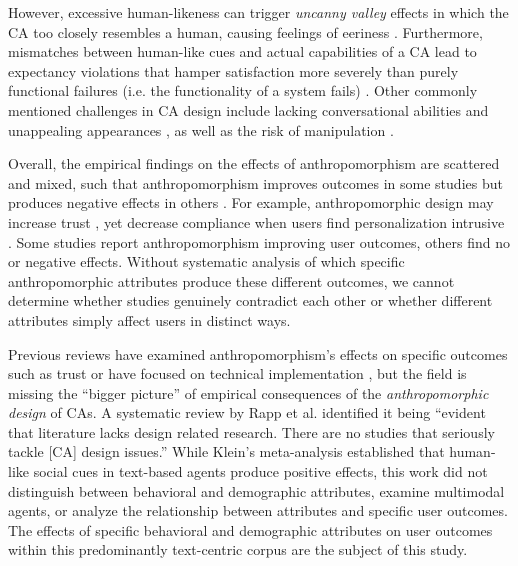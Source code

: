 \documentclass[lettersize,journal]{IEEEtran}
\begin{document}
However, excessive human-likeness can trigger \textit{uncanny valley} effects in which the CA too closely resembles a human, causing feelings of eeriness \cite{mori_bukimi_1970,soni2024chatbot}. Furthermore, mismatches between human-like cues and actual capabilities of a CA lead to expectancy violations that hamper satisfaction more severely than purely functional failures (i.e. the functionality of a system fails) \cite{ischen2024communication,qu2024chatbot}. Other commonly mentioned challenges in CA design include lacking conversational abilities and unappealing appearances \cite{diederich_design_2022}, as well as the risk of manipulation \cite{chaves2021should}.

Overall, the empirical findings on the effects of anthropomorphism are scattered and mixed, such that anthropomorphism improves outcomes in some studies \cite{go2019humanizing} but produces negative effects in others \cite{crolic2022blame}. For example, anthropomorphic design may increase trust \cite{go2019humanizing,konya2023anthropomorphism}, yet decrease compliance when users find personalization intrusive \cite{chen_you_2021}. Some studies report anthropomorphism improving user outcomes, others find no or negative effects. Without systematic analysis of which specific anthropomorphic attributes produce these different outcomes, we cannot determine whether studies genuinely contradict each other or whether different attributes simply affect users in distinct ways.

Previous reviews have examined anthropomorphism's effects on specific outcomes such as trust \cite{bach2024systematic} or have focused on technical implementation \cite{chen2024trends}, but the field is missing the ``bigger picture'' of empirical consequences of the \textit{anthropomorphic design} of CAs. A systematic review by Rapp et al. \cite{rapp_human_2021} identified it being ``evident that literature lacks design related research. There are no studies that seriously tackle [CA] design issues.'' While Klein's \cite{klein_effects_2025} meta-analysis established that human-like social cues in text-based agents produce positive effects, this work did not distinguish between behavioral and demographic attributes, examine multimodal agents, or analyze the relationship between attributes and specific user outcomes. The effects of specific behavioral and demographic attributes on user outcomes within this predominantly text-centric corpus are the subject of this study.
\end{document}
